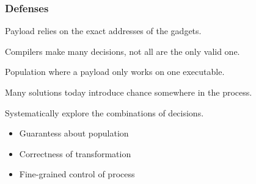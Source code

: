 \begin{frame}
	\frametitle{Defenses}

	Payload relies on the exact addresses of the gadgets.

	\vspace{0.5cm}

	Compilers make many decisions, not all are the only valid one.

	\vspace{0.5cm}

	Population where a payload only works on one executable.

	\vspace{0.5cm}

	Many solutions today introduce chance somewhere in the process.

	\vspace{0.5cm}

	Systematically explore the combinations of decisions.

	\begin{itemize}
		\item Guarantess about population
		\item Correctness of transformation
		\item Fine-grained control of process
	\end{itemize}

\end{frame}
